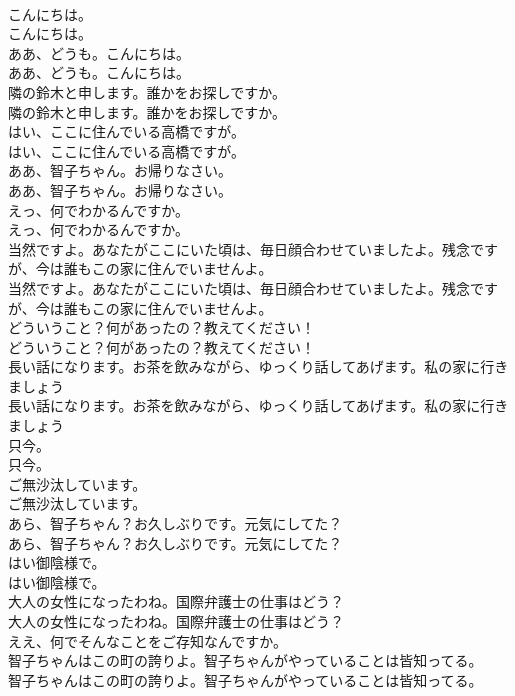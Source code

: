 \documentclass[8pt]{extreport}
\begin{document}
\begin{CJK}{UTF8}{min}
\\	こんにちは。	
\\	こんにちは。 
\\	ああ、どうも。こんにちは。	
\\	ああ、どうも。こんにちは。 
\\	隣の鈴木と申します。誰かをお探しですか。	
\\	隣の鈴木と申します。誰かをお探しですか。 
\\	はい、ここに住んでいる高橋ですが。	
\\	はい、ここに住んでいる高橋ですが。 
\\	ああ、智子ちゃん。お帰りなさい。	
\\	ああ、智子ちゃん。お帰りなさい。 
\\	えっ、何でわかるんですか。	
\\	えっ、何でわかるんですか。 
\\	当然ですよ。あなたがここにいた頃は、毎日顔合わせていましたよ。残念ですが、今は誰もこの家に住んでいませんよ。	
\\	当然ですよ。あなたがここにいた頃は、毎日顔合わせていましたよ。残念ですが、今は誰もこの家に住んでいませんよ。 
\\	どういうこと？何があったの？教えてください！	
\\	どういうこと？何があったの？教えてください！ 
\\	長い話になります。お茶を飲みながら、ゆっくり話してあげます。私の家に行きましょう
\\	長い話になります。お茶を飲みながら、ゆっくり話してあげます。私の家に行きましょう
\\	只今。	
\\	只今。 
\\	ご無沙汰しています。	
\\	ご無沙汰しています。 
\\	あら、智子ちゃん？お久しぶりです。元気にしてた？	
\\	あら、智子ちゃん？お久しぶりです。元気にしてた？ 
\\	はい御陰様で。	
\\	はい御陰様で。 
\\	大人の女性になったわね。国際弁護士の仕事はどう？	
\\	大人の女性になったわね。国際弁護士の仕事はどう？ 
\\	ええ、何でそんなことをご存知なんですか。 
\\	智子ちゃんはこの町の誇りよ。智子ちゃんがやっていることは皆知ってる。	
\\	智子ちゃんはこの町の誇りよ。智子ちゃんがやっていることは皆知ってる。 

\end{CJK}
\end{document}
